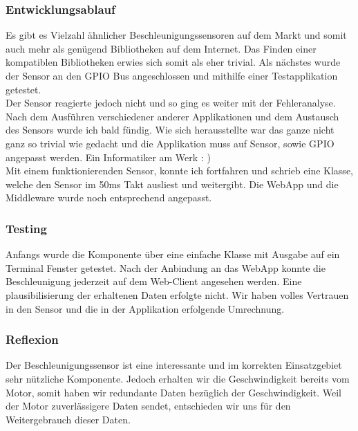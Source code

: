 \documentclass[../../main.tex]{subfiles}
\begin{document}
\subsubsection{Entwicklungsablauf}
Es gibt es Vielzahl ähnlicher Beschleunigungssensoren auf dem Markt und somit auch mehr als genügend Bibliotheken auf dem Internet. Das Finden einer kompatiblen Bibliotheken erwies sich somit als eher trivial. Als nächstes wurde der Sensor an den GPIO Bus angeschlossen und mithilfe einer Testapplikation getestet. \\
Der Sensor reagierte jedoch nicht und so ging es weiter mit der Fehleranalyse. Nach dem Ausführen verschiedener anderer Applikationen und dem Austausch des Sensors wurde ich bald fündig. Wie sich herausstellte war das ganze nicht ganz so trivial wie gedacht und die Applikation muss auf Sensor, sowie GPIO angepasst werden. Ein Informatiker am Werk : )\\
Mit einem funktionierenden Sensor, konnte ich fortfahren und schrieb eine Klasse, welche den Sensor im 50ms Takt ausliest und weitergibt. Die WebApp und die Middleware wurde noch entsprechend angepasst.\\

\subsubsection{Testing}
Anfangs wurde die Komponente über eine einfache Klasse mit Ausgabe auf ein Terminal Fenster getestet. Nach der Anbindung an das WebApp konnte die Beschleunigung jederzeit auf dem Web-Client angesehen werden. Eine plausibilisierung der erhaltenen Daten erfolgte nicht. Wir haben volles Vertrauen in den Sensor und die in der Applikation erfolgende Umrechnung.

\subsubsection{Reflexion}
Der Beschleunigungssensor ist eine interessante und im korrekten Einsatzgebiet sehr nützliche Komponente. Jedoch erhalten wir die Geschwindigkeit bereits vom Motor, somit haben wir redundante Daten bezüglich der Geschwindigkeit. Weil der Motor zuverlässigere Daten sendet, entschieden wir uns für den Weitergebrauch dieser Daten.
\end{document}
